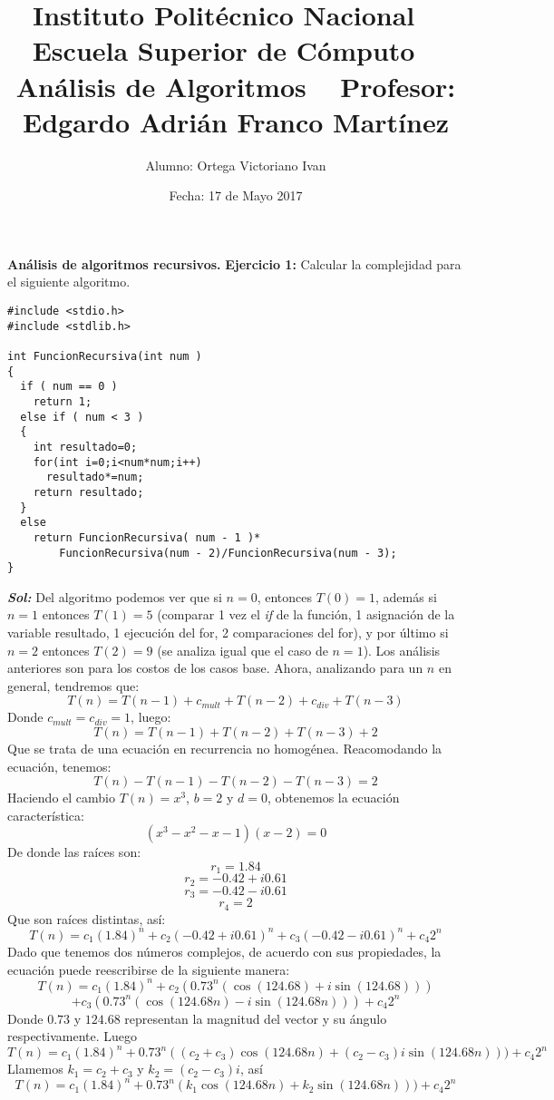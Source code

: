 \documentclass[12pt, letterpaper, oneside]{article}
\title{\textbf{Instituto Politécnico Nacional
		\vspace{10mm}	 \ \newline	
		Escuela Superior de Cómputo}
		\vspace{10mm}	 \ \newline	
		Análisis de Algoritmos
		\vspace{10mm}	 \ \newline	
		Profesor: Edgardo Adrián Franco Martínez}
\author{Alumno: Ortega Victoriano Ivan}
\date{Fecha: 17 de Mayo 2017}
\begin{document}
\maketitle
\newpage
\justify
\textbf{Análisis de algoritmos recursivos.}
\newline
\textbf{Ejercicio 1:} Calcular la complejidad para el siguiente algoritmo. 
\begin{lstlisting}
#include <stdio.h>
#include <stdlib.h>

int FuncionRecursiva(int num )
{
  if ( num == 0 )
    return 1;
  else if ( num < 3 )
  {
    int resultado=0;
    for(int i=0;i<num*num;i++)
      resultado*=num;
    return resultado;
  }
  else
    return FuncionRecursiva( num - 1 )*
    	FuncionRecursiva(num - 2)/FuncionRecursiva(num - 3);
}
\end{lstlisting}
\justify
\textbf{\textit{Sol:}}
Del algoritmo podemos ver que si $n = 0$, entonces $T(0) = 1$, además si $n = 1$ entonces $T(1) = 5$ (comparar 1 vez el \textit{if} de la función, 1 asignación de la variable resultado, 1 ejecución del for, 2 comparaciones del for), y por último si $n = 2$ entonces $T(2) = 9$ (se analiza igual que el caso de $n = 1$). Los análisis anteriores son para los costos de los casos base.
\newline
Ahora, analizando para un $n$ en general, tendremos que:
\[T(n) = T(n-1)+c_{mult}+T(n-2)+c_{div}+T(n-3)\]
Donde $c_{mult}=c_{div}=1$, luego:
\[T(n) = T(n-1)+T(n-2)+T(n-3)+2\]
Que se trata de una ecuación en recurrencia no homogénea.
\newline
Reacomodando la ecuación, tenemos:
\[T(n)-T(n-1)-T(n-2)-T(n-3)=2\]
Haciendo el cambio $T(n) = x^{3}$, $b = 2$ y $d = 0$, obtenemos la ecuación característica:
\[(x^{3}-x^{2}-x-1)(x-2)=0\]
De donde las raíces son:
\[r_{1}=1.84\]
\[r_{2}=-0.42+i0.61\]
\[r_{3}=-0.42-i0.61\]
\[r_{4}=2\]
Que son raíces distintas, así:
\[T(n)=c_{1}(1.84)^{n}+c_{2}(-0.42+i0.61)^{n}+c_{3}(-0.42-i0.61)^{n}+c_{4}2^{n}\]
\justify
Dado que tenemos dos números complejos, de acuerdo con sus propiedades, la ecuación puede reescribirse de la siguiente manera:
\[T(n)=c_{1}(1.84)^{n}+c_{2}(0.73^{n}(\cos(124.68)+i\sin(124.68)))\]
\[+c_{3}(0.73^{n}(\cos(124.68n)-i\sin(124.68n)))+c_{4}2^{n}\]
Donde $0.73$ y $124.68$ representan la magnitud del vector y su ángulo respectivamente. Luego
\[T(n)=c_{1}(1.84)^{n}+0.73^{n}((c_{2}+c_{3})\cos(124.68n)+(c_{2}-c_{3})i\sin(124.68n)))+c_{4}2^{n}\]
Llamemos $k_{1}=c_{2}+c_{3}$ y $k_{2}=(c_{2}-c_{3})i$, así
\[T(n)=c_{1}(1.84)^{n}+0.73^{n}(k_{1}\cos(124.68n)+k_{2}\sin(124.68n)))+c_{4}2^{n}\]
\end{document}
